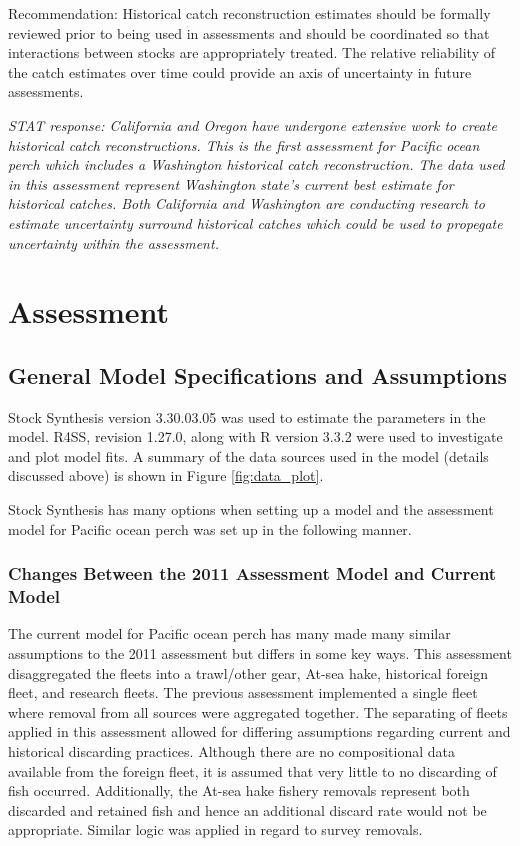 \documentclass[12pt,]{article}
\begin{document}
Recommendation: Historical catch reconstruction estimates should be
formally reviewed prior to being used in assessments and should be
coordinated so that interactions between stocks are appropriately
treated. The relative reliability of the catch estimates over time could
provide an axis of uncertainty in future assessments.

\emph{STAT response: California and Oregon have undergone extensive work
to create historical catch reconstructions. This is the first assessment
for Pacific ocean perch which includes a Washington historical catch
reconstruction. The data used in this assessment represent Washington
state's current best estimate for historical catches. Both California
and Washington are conducting research to estimate uncertainty surround
historical catches which could be used to propegate uncertainty within
the assessment.}

\section{Assessment}\label{assessment}

\subsection{General Model Specifications and
Assumptions}\label{general-model-specifications-and-assumptions}

Stock Synthesis version 3.30.03.05 was used to estimate the parameters
in the model. R4SS, revision 1.27.0, along with R version 3.3.2 were
used to investigate and plot model fits. A summary of the data sources
used in the model (details discussed above) is shown in Figure
\ref{fig:data_plot}.

Stock Synthesis has many options when setting up a model and the
assessment model for Pacific ocean perch was set up in the following
manner.

\subsubsection{Changes Between the 2011 Assessment Model and Current
Model}\label{changes-between-the-2011-assessment-model-and-current-model}

The current model for Pacific ocean perch has many made many similar
assumptions to the 2011 assessment but differs in some key ways. This
assessment disaggregated the fleets into a trawl/other gear, At-sea
hake, historical foreign fleet, and research fleets. The previous
assessment implemented a single fleet where removal from all sources
were aggregated together. The separating of fleets applied in this
assessment allowed for differing assumptions regarding current and
historical discarding practices. Although there are no compositional
data available from the foreign fleet, it is assumed that very little to
no discarding of fish occurred. Additionally, the At-sea hake fishery
removals represent both discarded and retained fish and hence an
additional discard rate would not be appropriate. Similar logic was
applied in regard to survey removals.
\end{document}
